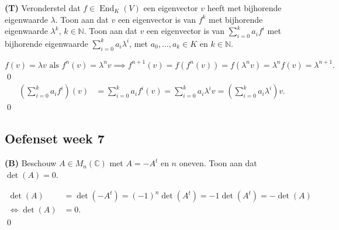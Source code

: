 \begin{oefening}[6.2.1] \textbf{(T)}
    Veronderstel dat $f \in \operatorname{End}_K(V)$ een eigenvector $v$ heeft met bijhorende eigenwaarde $\lambda$. Toon aan dat $v$ een eigenvector is van $f^k$ met bijhorende eigenwaarde $\lambda^k$, $k \in \mathbb{N}$.
    Toon aan dat $v$ een eigenvector is van $\sum_{i=0}^k a_i f^i$ met bijhorende eigenwaarde $\sum_{i=0}^k a_i \lambda^i$, met $a_0, \dots, a_k \in K$ en $k \in \mathbb{N}$.

    \(f(v) = \lambda v \text{ als } f^n(v) = \lambda^n v \implies f^{n+1}(v)
    =  f(f^{n}(v)) = f(\lambda^n v) = \lambda^n f(v) = \lambda^{n+1}.\)\qed
    \begin{align*}
        \left(\sum_{i=0}^k a_i f^i\right)(v)
        &= \sum_{i=0}^k a_i f^i(v)
        = \sum_{i=0}^k a_i \lambda^{i} v
         = \left(\sum_{i=0}^k a_i \lambda^{i}\right) v.
    \end{align*}\qed
\end{oefening}

\subsection{Oefenset week 7}

\begin{oefening}[5.4.3] \textbf{(B)}
    Beschouw $A \in M_n(\mathbb{C})$ met $A = -A^t$ en $n$ oneven. Toon aan dat $\det(A) = 0$.

    \begin{align*}
        \det (A)
        &= \det(-A^t)
        = (-1)^n \det(A^t)
        = -1 \det(A^t)
        = - \det(A)\\
        \iff \det(A) &= 0 .
    \end{align*}\qed
\end{oefening}
